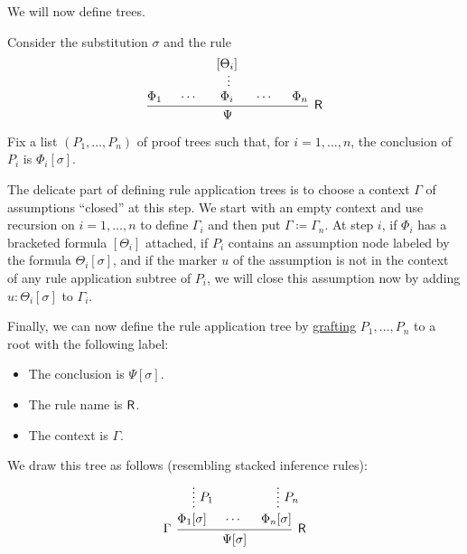 \begin{definition}
\begin{thmenum}[resume=def:natural_deduction_proof_tree]
     We will now define  trees.

    Consider the substitution \( \sigma \) and the rule
    \begin{equation*}
      \begin{prooftree}
        \hypo{ \Phi_1 }
        \hypo{ \cdots }
        \hypo{ [\Theta_i] }
        \ellipsis {} { \Phi_i }
        \hypo{ \cdots }
        \hypo{ \Phi_n }
        \infer5[\logic{R}]{ \Psi }
      \end{prooftree}
    \end{equation*}

    Fix a list \( (P_1, \ldots, P_n) \) of proof trees such that, for \( i = 1, \ldots, n \), the conclusion of \( P_i \) is \( \Phi_i[\sigma] \).

    The delicate part of defining rule application trees is to choose a context \( \Gamma \) of assumptions \enquote{closed} at this step. We start with an empty context and use recursion on \( i = 1, \ldots, n \) to define \( \Gamma_i \) and then put \( \Gamma \coloneqq \Gamma_n \). At step \( i \), if \( \Phi_i \) has a bracketed formula \( [\Theta_i] \) attached, if \( P_i \) contains an assumption node labeled by the formula \( \Theta_i[\sigma] \), and if the marker \( u \) of the assumption is not in the context of any rule application subtree of \( P_i \), we will close this assumption now by adding \( u: \Theta_i[\sigma] \) to \( \Gamma_i \).

    Finally, we can now define the rule application tree by \hyperref[def:ordered_tree_grafting]{grafting} \( P_1, \ldots, P_n \) to a root with the following label:
    \begin{itemize}
      \item The conclusion is \( \Psi[\sigma] \).
      \item The rule name is \( \textsf{R} \).
      \item The context is \( \Gamma \).
    \end{itemize}

    We draw this tree as follows (resembling stacked inference rules):
    \begin{equation*}
      \begin{prooftree}
        \hypo{}
        \ellipsis { \( P_1 \) } { \Phi_1[\sigma] }

        \hypo{ \cdots }

        \hypo{}
        \ellipsis { \( P_n \) } { \Phi_n[\sigma] }
        \infer[left label=\( \Gamma \)]3[\logic{R}]{ \Psi[\sigma] }
      \end{prooftree}
    \end{equation*}
  \end{thmenum}
\end{definition}

